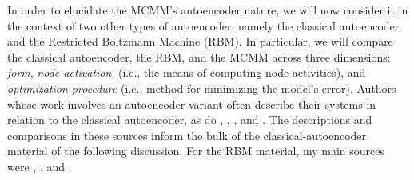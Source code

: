 In order to elucidate the MCMM's autoencoder nature, we will now consider it in the context
of two other types of autoencoder, namely the classical autoencoder and the Restricted Boltzmann Machine (RBM).
In particular, we will compare the classical autoencoder, the RBM, and the MCMM across three dimensions: \emph{form}, \emph{node activation}, 
(i.e., the means of computing node activities), and \emph{optimization procedure}
(i.e., method for minimizing the model's error). 
Authors whose work involves an autoencoder variant often describe their systems in relation to 
the classical autoencoder, as do \citet{vincent:2010}, \citet{vincent:2011}, \citet{baldi:2012}, and \citet{chen-and-deng:2016}. 
The descriptions and comparisons in these sources inform the bulk of the classical-autoencoder material of the following discussion.
For the RBM material, my main sources were \citet{hinton-and-salak:2006}, \citet{cueto-et-al:2009},  and \citet{fischer:2014}.

